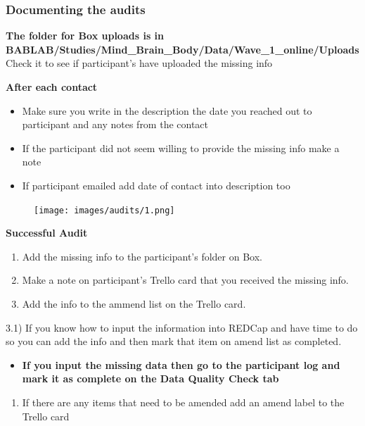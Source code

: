 \documentclass[
]{book}
\providecommand{\tightlist}{%
  \setlength{\itemsep}{0pt}\setlength{\parskip}{0pt}}
\begin{document}
\hypertarget{documenting-the-audits}{%
\subsubsection{\texorpdfstring{\textbf{Documenting the audits}}{Documenting the audits}}\label{documenting-the-audits}}

\textbf{The folder for Box uploads is in BABLAB/Studies/Mind\_Brain\_Body/Data/Wave\_1\_online/Uploads} Check it to see if participant's have uploaded the missing info

\textbf{After each contact}

\begin{itemize}
\item
  Make sure you write in the description the date you reached out to participant and any notes from the contact
\item
  If the participant did not seem willing to provide the missing info make a note
\item
  If participant emailed add date of contact into description too
\end{itemize}

\begin{figure}
\centering
\texttt{[image: images/audits/1.png]}
\caption{}
\end{figure}

\textbf{Successful Audit}

\begin{enumerate}
\def\labelenumi{\arabic{enumi})}
\item
  Add the missing info to the participant's folder on Box.
\item
  Make a note on participant's Trello card that you received the missing info.
\item
  Add the info to the ammend list on the Trello card.
\end{enumerate}

3.1) If you know how to input the information into REDCap and have time to do so you can add the info and then mark that item on amend list as completed.

\begin{itemize}
\tightlist
\item
  \textbf{If you input the missing data then go to the participant log and mark it as complete on the Data Quality Check tab}
\end{itemize}

\begin{enumerate}
\def\labelenumi{\arabic{enumi})}
\setcounter{enumi}{3}
\tightlist
\item
  If there are any items that need to be amended add an amend label to the Trello card
\end{enumerate}
\end{document}
